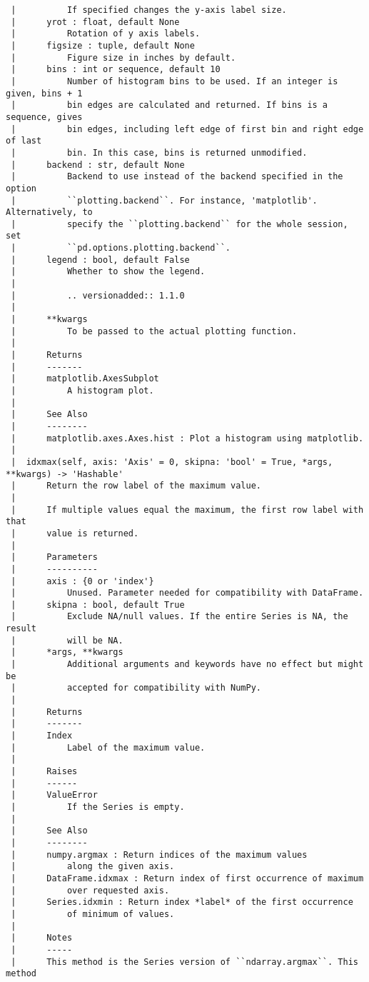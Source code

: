 \documentclass[
  letterpaper,
  DIV=11,
  numbers=noendperiod]{scrreprt}
\begin{document}
\begin{verbatim}
 |          If specified changes the y-axis label size.
 |      yrot : float, default None
 |          Rotation of y axis labels.
 |      figsize : tuple, default None
 |          Figure size in inches by default.
 |      bins : int or sequence, default 10
 |          Number of histogram bins to be used. If an integer is given, bins + 1
 |          bin edges are calculated and returned. If bins is a sequence, gives
 |          bin edges, including left edge of first bin and right edge of last
 |          bin. In this case, bins is returned unmodified.
 |      backend : str, default None
 |          Backend to use instead of the backend specified in the option
 |          ``plotting.backend``. For instance, 'matplotlib'. Alternatively, to
 |          specify the ``plotting.backend`` for the whole session, set
 |          ``pd.options.plotting.backend``.
 |      legend : bool, default False
 |          Whether to show the legend.
 |      
 |          .. versionadded:: 1.1.0
 |      
 |      **kwargs
 |          To be passed to the actual plotting function.
 |      
 |      Returns
 |      -------
 |      matplotlib.AxesSubplot
 |          A histogram plot.
 |      
 |      See Also
 |      --------
 |      matplotlib.axes.Axes.hist : Plot a histogram using matplotlib.
 |  
 |  idxmax(self, axis: 'Axis' = 0, skipna: 'bool' = True, *args, **kwargs) -> 'Hashable'
 |      Return the row label of the maximum value.
 |      
 |      If multiple values equal the maximum, the first row label with that
 |      value is returned.
 |      
 |      Parameters
 |      ----------
 |      axis : {0 or 'index'}
 |          Unused. Parameter needed for compatibility with DataFrame.
 |      skipna : bool, default True
 |          Exclude NA/null values. If the entire Series is NA, the result
 |          will be NA.
 |      *args, **kwargs
 |          Additional arguments and keywords have no effect but might be
 |          accepted for compatibility with NumPy.
 |      
 |      Returns
 |      -------
 |      Index
 |          Label of the maximum value.
 |      
 |      Raises
 |      ------
 |      ValueError
 |          If the Series is empty.
 |      
 |      See Also
 |      --------
 |      numpy.argmax : Return indices of the maximum values
 |          along the given axis.
 |      DataFrame.idxmax : Return index of first occurrence of maximum
 |          over requested axis.
 |      Series.idxmin : Return index *label* of the first occurrence
 |          of minimum of values.
 |      
 |      Notes
 |      -----
 |      This method is the Series version of ``ndarray.argmax``. This method

\end{verbatim}
\end{document}
